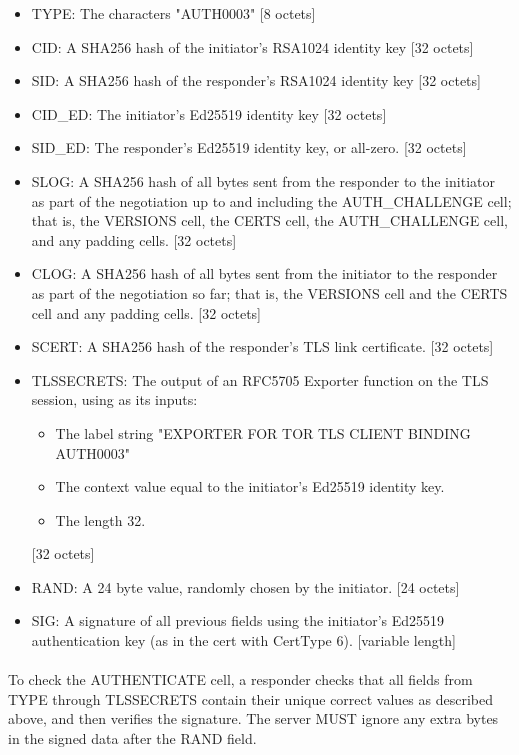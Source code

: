 \begin{itemize}
    \item TYPE: The characters "AUTH0003" [8 octets]
    \item CID: A SHA256 hash of the initiator's RSA1024 identity key [32 octets]
    \item SID: A SHA256 hash of the responder's RSA1024 identity key [32 octets]
    \item CID\_ED: The initiator's Ed25519 identity key [32 octets]
    \item SID\_ED: The responder's Ed25519 identity key, or all-zero. [32 octets]
    \item SLOG: A SHA256 hash of all bytes sent from the responder to the
    initiator as part of the negotiation up to and including the
    AUTH\_CHALLENGE cell; that is, the VERSIONS cell, the CERTS cell,
    the AUTH\_CHALLENGE cell, and any padding cells. [32 octets]
    \item CLOG: A SHA256 hash of all bytes sent from the initiator to the
    responder as part of the negotiation so far; that is, the
    VERSIONS cell and the CERTS cell and any padding cells. [32
    octets]
    \item SCERT: A SHA256 hash of the responder's TLS link certificate. [32
    octets]
    \item TLSSECRETS: The output of an RFC5705 Exporter function on the
    TLS session, using as its inputs:
    \begin{itemize}
        \item The label string "EXPORTER FOR TOR TLS CLIENT BINDING AUTH0003"
        \item The context value equal to the initiator's Ed25519 identity key.
        \item The length 32.
    \end{itemize}[32 octets]
    \item RAND: A 24 byte value, randomly chosen by the initiator. [24 octets]
    \item SIG: A signature of all previous fields using the initiator's
    Ed25519 authentication key (as in the cert with CertType 6).
    [variable length]
\end{itemize}

\paragraph{}
To check the AUTHENTICATE cell, a responder checks that all fields
from TYPE through TLSSECRETS contain their unique
correct values as described above, and then verifies the signature.
The server MUST ignore any extra bytes in the signed data after
the RAND field.


